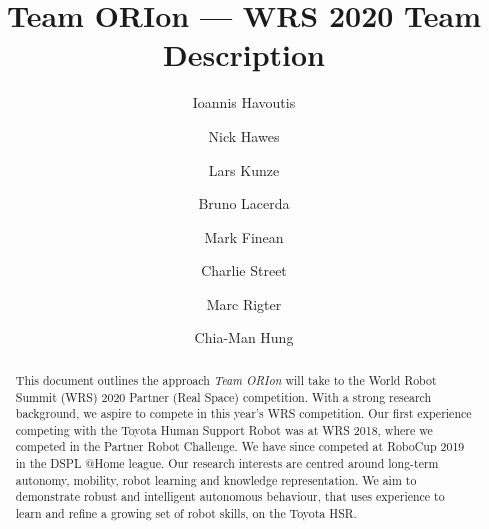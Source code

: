 \documentclass[runningheads,a4paper]{llncs}
\newcommand{\teamori}{Team ORIon}
\begin{document}

\title{\teamori{} --- WRS 2020 Team Description}

\author{Ioannis Havoutis \and Nick Hawes \and Lars Kunze \and Bruno Lacerda 
\and Mark Finean \and Charlie Street \and Marc Rigter \and Chia-Man Hung}

\maketitle


\begin{abstract}
This document outlines the approach \textit{\teamori} will take to the 
World Robot Summit (WRS) 2020 Partner (Real Space) competition. 
With a strong research background, we aspire to compete 
in this year's WRS competition. Our first experience competing with the Toyota Human 
Support Robot was at WRS 2018, where we competed in the Partner 
Robot Challenge. We have since competed at RoboCup 2019 in the DSPL @Home league.
Our research interests are centred around long-term
autonomy, mobility, robot learning and knowledge representation. We aim to demonstrate robust and intelligent autonomous behaviour, that uses
experience to learn and refine a growing set of robot skills, on the Toyota
HSR.
\end{abstract}


\end{document}
